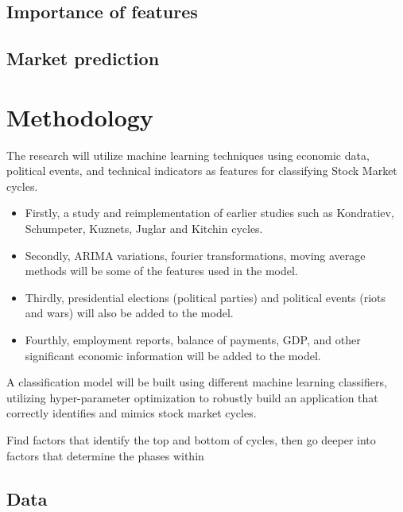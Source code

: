 \documentclass[]{book}
\begin{document}
\hypertarget{importance-of-features}{%
\section{Importance of features}\label{importance-of-features}}

\hypertarget{market-prediction}{%
\section{Market prediction}\label{market-prediction}}

\hypertarget{methodology}{%
\chapter{Methodology}\label{methodology}}

The research will utilize machine learning techniques using economic data, political events, and technical indicators as features for classifying Stock Market cycles.

\begin{itemize}
\item
  Firstly, a study and reimplementation of earlier studies such as Kondratiev, Schumpeter, Kuznets, Juglar and Kitchin cycles.
\item
  Secondly, ARIMA variations, fourier transformations, moving average methods will be some of the features used in the model.
\item
  Thirdly, presidential elections (political parties) and political events (riots and wars) will also be added to the model.
\item
  Fourthly, employment reports, balance of payments, GDP, and other significant economic information will be added to the model.
\end{itemize}

A classification model will be built using different machine learning classifiers, utilizing hyper-parameter optimization to robustly build an application that correctly identifies and mimics stock market cycles.

Find factors that identify the top and bottom of cycles, then go deeper into factors that determine the phases within

\hypertarget{data}{%
\section{Data}\label{data}}
\end{document}
